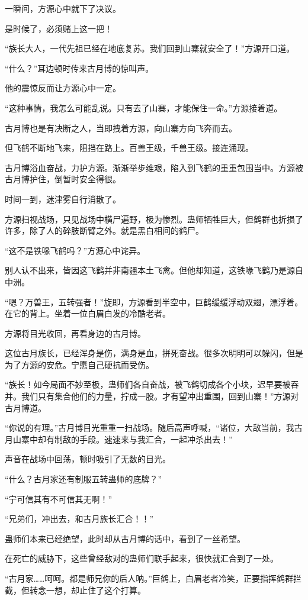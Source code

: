 \begin{this_body}
一瞬间，方源心中就下了决议。

是时候了，必须赌上这一把！

“族长大人，一代先祖已经在地底复苏。我们回到山寨就安全了！”方源开口道。

“什么？”耳边顿时传来古月博的惊叫声。

他的震惊反而让方源心中一定。

“这种事情，我怎么可能乱说。只有去了山寨，才能保住一命。”方源接着道。

古月博也是有决断之人，当即拽着方源，向山寨方向飞奔而去。

但飞鹤不断地飞来，阻挡在路上。百兽王级，千兽王级。接连涌现。

古月博浴血奋战，力护方源。渐渐举步维艰，陷入到飞鹤的重重包围当中。方源被古月博护住，倒暂时安全得很。

时间一到，迷津雾自行消散了。

方源扫视战场，只见战场中横尸遍野，极为惨烈。蛊师牺牲巨大，但鹤群也折损了许多，除了人的碎肢断臂之外。就是黑白相间的鹤尸。

“这不是铁喙飞鹤吗？”方源心中诧异。

别人认不出来，皆因这飞鹤并非南疆本土飞禽。但他却知道，这铁喙飞鹤乃是源自中洲。

“嗯？万兽王，五转强者！”旋即，方源看到半空中，巨鹤缓缓浮动双翅，漂浮着。在它的背上。坐着一位白眉白发的冷酷老者。

方源将目光收回，再看身边的古月博。

这位古月族长，已经浑身是伤，满身是血，拼死奋战。很多次明明可以躲闪，但是为了方源的安危。宁愿自己硬抗而受伤。

“族长！如今局面不妙至极，蛊师们各自奋战，被飞鹤切成各个小块，迟早要被吞并。我们只有集合他们的力量，拧成一股。才有望冲出重围，回到山寨！”方源对古月博道。

“你说的有理。”古月博目光重重一扫战场。随后高声呼喊，“诸位，大敌当前，我古月山寨中却有制敌的手段。速速来与我汇合，一起冲杀出去！”

声音在战场中回荡，顿时吸引了无数的目光。

“什么？古月家还有制服五转蛊师的底牌？”

“宁可信其有不可信其无啊！”

“兄弟们，冲出去，和古月族长汇合！！”

蛊师们本来已经绝望，此时却从古月博的话中，看到了一丝希望。

在死亡的威胁下，这些曾经敌对的蛊师们联手起来，很快就汇合到了一处。

“古月家……呵呵。都是师兄你的后人呐。”巨鹤上，白眉老者冷笑，正要指挥鹤群拦截，但转念一想，却止住了这个打算。


\end{this_body}
